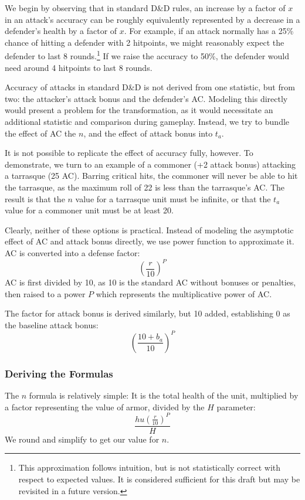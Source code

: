 \documentclass[twocolumn]{article}
\begin{document}
We begin by observing that in standard D\&D rules,
an increase by a factor of $x$ in an attack's accuracy
can be roughly equivalently represented by a decrease in a defender's
health by a factor of $x$.
For example, if an attack normally has a 25\% chance of hitting a defender with 2 hitpoints,
we might reasonably expect the defender to last 8 rounds.\footnote{
    This approximation follows intuition,
    but is not statistically correct with respect to expected values.
    It is considered sufficient for this draft
    but may be revisited in a future version.
}
If we raise the accuracy to 50\%,
the defender would need around 4 hitpoints to last 8 rounds.

Accuracy of attacks in standard D\&D is not derived from one statistic,
but from two: the attacker's attack bonus and the defender's AC.
Modeling this directly would present a problem for the transformation,
as it would necessitate an additional statistic and comparison during gameplay.
Instead, we try to bundle the effect of AC the $n$,
and the effect of attack bonus into $t_a$.

It is not possible to replicate the effect of accuracy fully, however.
To demonstrate, we turn to an example of a commoner (+2 attack bonus)
attacking a tarrasque (25 AC).
Barring critical hits, the commoner will never be able to hit the tarrasque,
as the maximum roll of 22 is less than the tarrasque's AC.
The result is that the $n$ value for a tarrasque unit must be infinite,
or that the $t_a$ value for a commoner unit must be at least 20.

Clearly, neither of these options is practical.
Instead of modeling the asymptotic effect of AC and attack bonus directly,
we use power function to approximate it.
AC is converted into a defense factor:
\[
    \left(\frac{r}{10}\right)^P
\]
AC is first divided by 10,
as 10 is the standard AC without bonuses or penalties,
then raised to a power $P$ which represents the multiplicative power of AC.

The factor for attack bonus is derived similarly,
but 10 added, establishing 0 as the baseline attack bonus:
\[
    \left(\frac{10 + b_a}{10}\right)^P
\]

\subsubsection{Deriving the Formulas}

The $n$ formula is relatively simple:
It is the total health of the unit,
multiplied by a factor representing the value of armor,
divided by the $H$ parameter:
\[
    \frac
        {h u (\frac{r}{10})^P}
        {H}
\]
We round and simplify to get our value for $n$.
\end{document}
